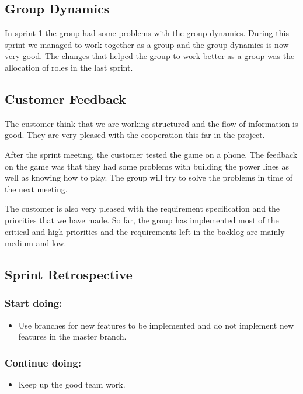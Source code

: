 \subsection{Group Dynamics}
	In sprint 1 the group had some problems with the group dynamics. 
	During this sprint we managed to work together as a group and the group dynamics
	is now very good. The changes that helped the group to work better as a group
	was the allocation of roles in the last sprint. 

\subsection{Customer Feedback}
	The customer think that we are working structured and the flow of information is good.
	They are very pleased with the cooperation this far in the project.

	After the sprint meeting, the customer tested the game on a phone. The feedback on the game
	was that they had some problems with building the power lines as well as knowing how to play.
	The group will try to solve the problems in time of the next meeting.

	The customer is also very pleased with the requirement specification and the priorities
	that we have made. So far, the group has implemented most of the critical and high
	priorities and the requirements left in the backlog are mainly medium and low. 

\subsection{Sprint Retrospective}
	\subsubsection*{Start doing: } 
		\begin{itemize}
			\item Use branches for new features to be implemented and do not implement new 
			features in the master branch.
		\end{itemize}
	\subsubsection*{Continue doing: }
		\begin{itemize}
			\item Keep up the good team work.
		\end{itemize}

